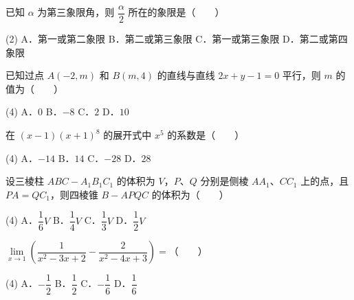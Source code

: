 
\begin{question}
已知 $\alpha$ 为第三象限角，则 $\dfrac{\alpha}{2}$ 所在的象限是\mbox{（　　）}

\begin{gkopts}(2)
\task A．第一或第二象限
\task B．第二或第三象限
\task C．第一或第三象限
\task D．第二或第四象限
\end{gkopts}

\end{question}
\begin{question}
已知过点 $A(-2, m)$ 和 $B(m, 4)$ 的直线与直线 $2x + y - 1 = 0$ 平行，则 $m$ 的值为\mbox{（　　）}

\begin{gkopts}(4)
\task A．$0$
\task B．$-8$
\task C．$2$
\task D．$10$
\end{gkopts}

\end{question}
\begin{question}
在 $(x - 1)(x + 1)^8$ 的展开式中 $x^5$ 的系数是\mbox{（　　）}

\begin{gkopts}(4)
\task A．$-14$
\task B．$14$
\task C．$-28$
\task D．$28$
\end{gkopts}

\end{question}
\begin{question}
设三棱柱 $ABC - A_1B_1C_1$ 的体积为 $V$，$P$、$Q$ 分别是侧棱 $AA_1$、$CC_1$ 上的点，且 $PA = QC_1$，则四棱锥 $B - APQC$ 的体积为\mbox{（　　）}

\begin{gkopts}(4)
\task A．$\dfrac{1}{6}V$
\task B．$\dfrac{1}{4}V$
\task C．$\dfrac{1}{3}V$
\task D．$\dfrac{1}{2}V$
\end{gkopts}

\end{question}
\begin{question}
$\lim\limits_{x \to 1}\left(\dfrac{1}{x^2 - 3x + 2} - \dfrac{2}{x^2 - 4x + 3}\right) =$\mbox{（　　）}

\begin{gkopts}(4)
\task A．$-\dfrac{1}{2}$
\task B．$\dfrac{1}{2}$
\task C．$-\dfrac{1}{6}$
\task D．$\dfrac{1}{6}$
\end{gkopts}

\end{question}
